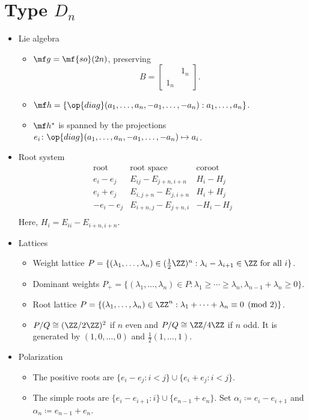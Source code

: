 \documentclass{article}
\begin{document}
\newpage
\section{Type \texorpdfstring{$D_n$}{ D n}}
\begin{itemize}
	\item Lie algebra
	\begin{itemize}
		\item $\mf g=\mf{so}(2n)$, preserving
		\[B=\begin{bmatrix}
			& 1_n \\ 1_n
		\end{bmatrix}.\]
		\item $\mf h=\{\op{diag}(a_1,\ldots,a_n,-a_1,\ldots,-a_n):a_1,\ldots,a_n\}$.
		\item $\mf h^*$ is spanned by the projections $e_i\colon\op{diag}(a_1,\ldots,a_n,-a_1,\ldots,-a_n)\mapsto a_i$.
	\end{itemize}
	\item Root system
	\[\begin{array}{c|cccccc}
		\text{root} & \text{root space} & \text{coroot} \\\hline
		e_i-e_j & E_{ij}-E_{j+n,i+n} & H_i-H_j \\
		e_i+e_j & E_{i,j+n}-E_{j,i+n} & H_i+H_j \\
		-e_i-e_j & E_{i+n,j}-E_{j+n,i} & -H_i-H_j \\
	\end{array}\]
	Here, $H_i=E_{ii}-E_{i+n,i+n}$.
	\item Lattices
	\begin{itemize}
		\item Weight lattice $P=\{(\lambda_1,\ldots,\lambda_{n})\in(\frac12\ZZ)^n:\lambda_i-\lambda_{i+1}\in\ZZ\text{ for all }i\}$.
		\item Dominant weights $P_+=\{(\lambda_1,\ldots,\lambda_n)\in P:\lambda_1\ge\cdots\ge\lambda_n,\lambda_{n-1}+\lambda_n\ge0\}$.
		\item Root lattice $P=\{(\lambda_1,\ldots,\lambda_{n})\in\ZZ^n:\lambda_1+\cdots+\lambda_n\equiv0\pmod2\}$.
		\item $P/Q\cong(\ZZ/2\ZZ)^2$ if $n$ even and $P/Q\cong\ZZ/4\ZZ$ if $n$ odd. It is generated by $(1,0,\ldots,0)$ and $\frac12(1,\ldots,1)$.
	\end{itemize}
	\item Polarization
	\begin{itemize}
		\item The positive roots are $\{e_i-e_j:i<j\}\cup\{e_i+e_j:i<j\}$.
		\item The simple roots are $\{e_i-e_{i+1}:i\}\cup\{e_{n-1}+e_n\}$. Set $\alpha_i\coloneqq e_i-e_{i+1}$ and $\alpha_n\coloneqq e_{n-1}+e_n$.

\end{itemize}
\end{itemize}
\end{document}
